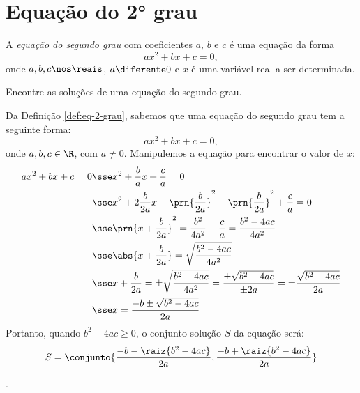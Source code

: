 \section{Equação do 2° grau}

\begin{definition}
	\label{def:eq-2-grau}
	A \emph{equação do segundo grau} com coeficientes $a$, $b$ e $c$ é uma equação da forma 
	\[
		ax^2 + bx + c = 0,
	\]
	onde $a, b, c \nos \reais$, $a \diferente 0$ e $x$ é uma variável real a ser determinada.
\end{definition}

\begin{example}
	\label{ex:sol-2-grau}
	Encontre as soluções de uma equação do segundo grau.
\end{example}

\begin{solution}
	Da Definição \ref{def:eq-2-grau}, sabemos que uma equação do segundo grau tem a seguinte forma:
	\[
		ax^2 + bx + c = 0,
	\]
	onde $a,b,c \in \R$, com $a \ne 0$. Manipulemos a equação para encontrar o valor de $x$:
	\begin{align*}
		ax^2 + bx + c = 0 & \sse x^2+\frac{b}{a}x +\frac{c}{a}=0 \\ 
						  & \sse x^2+2\frac{b}{2a}x+\prn{\frac{b}{2a}}^2-\prn{\frac{b}{2a}}^2+\frac{c}{a}=0\\ 
						  & \sse \prn{x+\frac{b}{2a}}^2=\frac{b^2}{4a^2}-\frac{c}{a}=\frac{b^2 -4ac}{4a^2}\\ 
						  & \sse \abs{x+\frac{b}{2a}} = \sqrt{\frac{b^2-4ac}{4a^2}}\\ 
						  & \sse x+\frac{b}{2a}=\pm\sqrt{\frac{b^2-4ac}{4a^2}}=\frac{\pm\sqrt{b^2-4ac}}{\pm2a}=\pm\frac{\sqrt{b^2-4ac}}{2a}\\ 
						  & \sse x=\frac{-b\pm\sqrt{b^2-4ac}}{2a}\\ 
	\end{align*}
	Portanto, quando $b^2-4ac \ge 0$, o conjunto-solução $S$ da equação será:
	\begin{align*}
		S = \conjunto{\dfrac {-b - \raiz{b^2 - 4ac}} {2a}, \dfrac{-b + \raiz{b^2 - 4ac}} {2a}}
	\end{align*}
\end{solution}

\begin{onlineact}
	.
\end{onlineact}

